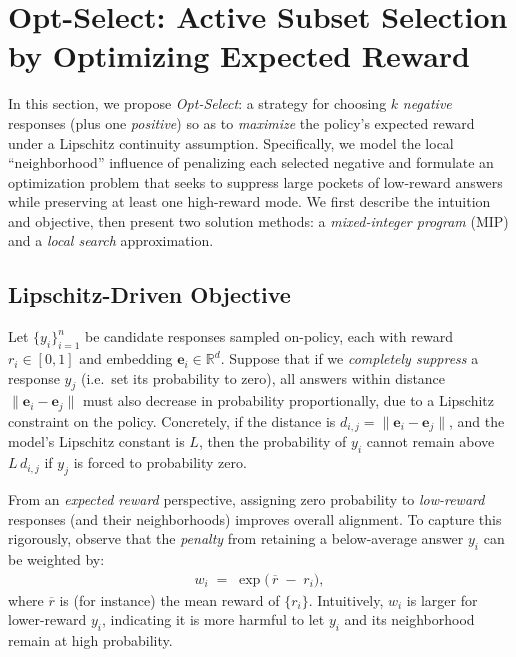\section{Opt-Select: Active Subset Selection by Optimizing Expected Reward}
\label{sec:opt_select}

In this section, we propose \emph{Opt-Select}: a strategy for choosing $k$ \emph{negative} responses (plus one \emph{positive}) so as to \emph{maximize} the policy’s expected reward under a Lipschitz continuity assumption. Specifically, we model the local “neighborhood” influence of penalizing each selected negative and formulate an optimization problem that seeks to suppress large pockets of low-reward answers while preserving at least one high-reward mode. We first describe the intuition and objective, then present two solution methods: a \emph{mixed-integer program} (MIP) and a \emph{local search} approximation.

\subsection{Lipschitz-Driven Objective}
\label{subsec:lipschitz_objective}

Let $\{y_i\}_{i=1}^n$ be candidate responses sampled on-policy, each with reward $r_i \in [0,1]$ and embedding $\mathbf{e}_i \in \mathbb{R}^d$. Suppose that if we \emph{completely suppress} a response $y_j$ (i.e.\ set its probability to zero), all answers within distance $\|\mathbf{e}_i - \mathbf{e}_j\|$ must also decrease in probability proportionally, due to a Lipschitz constraint on the policy. Concretely, if the distance is $d_{i,j} = \|\mathbf{e}_i - \mathbf{e}_j\|$, and the model’s Lipschitz constant is $L$, then the probability of $y_i$ cannot remain above $L\,d_{i,j}$ if $y_j$ is forced to probability zero.

From an \emph{expected reward} perspective, assigning zero probability to \emph{low-reward} responses (and their neighborhoods) improves overall alignment. To capture this rigorously, observe that the \emph{penalty} from retaining a below-average answer $y_i$ can be weighted by:
\begin{align}
\label{eq:weight_w_i}
    w_i 
    \;=\;
    \exp\bigl(\,\overline{r} \;-\; r_i\bigr),
\end{align}
where $\overline{r}$ is (for instance) the mean reward of $\{r_i\}$. Intuitively, $w_i$ is larger for lower-reward $y_i$, indicating it is more harmful to let $y_i$ and its neighborhood remain at high probability.

